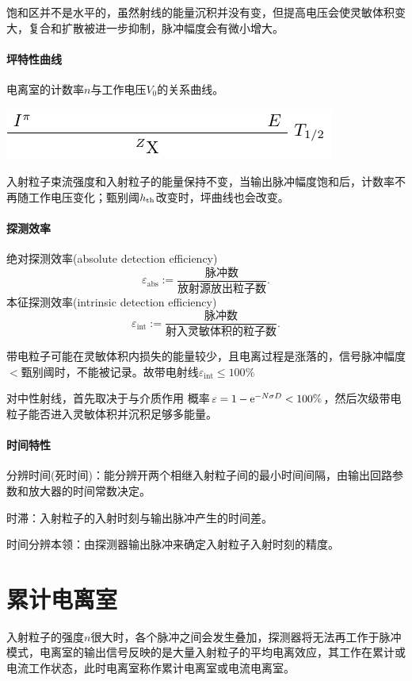 饱和区并不是水平的，虽然射线的能量沉积并没有变，但提高电压会使灵敏体积变大，复合和扩散被进一步抑制，脉冲幅度会有微小增大。
\paragraph{坪特性曲线}
电离室的计数率$n$与工作电压$V_0$的关系曲线。
\begin{center}
	\includegraphics[page=22]{figures/tikz/layouts.pdf}
\end{center}
入射粒子束流强度和入射粒子的能量保持不变，当输出脉冲幅度饱和后，计数率不再随工作电压变化；甄别阈$h_{\mathrm{th}}$改变时，坪曲线也会改变。
\paragraph{探测效率}
绝对探测效率(absolute detection efficiency)
\[
	\varepsilon_{\mathrm{abs}}:=\frac{\text{脉冲数}}{\text{放射源放出粒子数}}.
\]
本征探测效率(intrinsic detection efficiency)
\[
	\varepsilon_{\mathrm{int}}:=\frac{\text{脉冲数}}{\text{射入灵敏体积的粒子数}}.
\]

带电粒子可能在灵敏体积内损失的能量较少，且电离过程是涨落的，信号脉冲幅度$<$甄别阈时，不能被记录。故带电射线$\varepsilon_{\mathrm{int}}\leqslant 100\%$

对中性射线，首先取决于与介质作用%
概率$\varepsilon=1-\mathop{}\!\mathrm{e}^{-N\sigma D}<100\%$，然后次级带电粒子能否进入灵敏体积并沉积足够多能量。
\paragraph{时间特性}
分辨时间(死时间)：能分辨开两个相继入射粒子间的最小时间间隔，由输出回路参数和放大器的时间常数决定。

时滞：入射粒子的入射时刻与输出脉冲产生的时间差。

时间分辨本领：由探测器输出脉冲来确定入射粒子入射时刻的精度。

\section{累计电离室}

入射粒子的强度$n$很大时，各个脉冲之间会发生叠加，探测器将无法再工作于脉冲模式，电离室的输出信号反映的是大量入射粒子的平均电离效应，其工作在累计或电流工作状态，此时电离室称作累计电离室或电流电离室。

